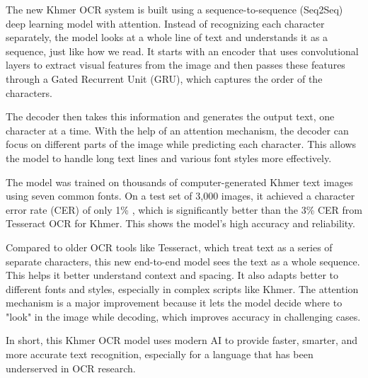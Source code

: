The new Khmer OCR system is built using a sequence-to-sequence (Seq2Seq) 
deep learning model with attention. Instead of recognizing each character separately, 
the model looks at a whole line of text and understands it as a sequence, 
just like how we read. It starts with an encoder that uses convolutional layers 
to extract visual features from the image and then passes these features 
through a Gated Recurrent Unit (GRU), which captures the order of the characters.

The decoder then takes this information and generates the output text, one character 
at a time. With the help of an attention mechanism, the decoder can focus on different 
parts of the image while predicting each character. This allows the model to handle 
long text lines and various font styles more effectively.

The model was trained on thousands of computer-generated Khmer text images using seven 
common fonts. On a test set of 3,000 images, it achieved a character error rate (CER) 
of only 1\% \citep{buoy2021seq2seq}, which is significantly better than the 3\% 
\citep{buoy2021seq2seq} CER from Tesseract OCR for Khmer. 
This shows the model's high accuracy and reliability.

Compared to older OCR tools like Tesseract, which treat text as a series of separate 
characters, this new end-to-end model sees the text as a whole sequence. 
This helps it better understand context and spacing. It also adapts better 
to different fonts and styles, especially in complex scripts like Khmer. 
The attention mechanism is a major improvement because it lets the model decide 
where to "look" in the image while decoding, which improves accuracy in challenging cases.

In short, this Khmer OCR model uses modern AI to provide faster, smarter, and 
more accurate text recognition, especially for a language that has been 
underserved in OCR research.

